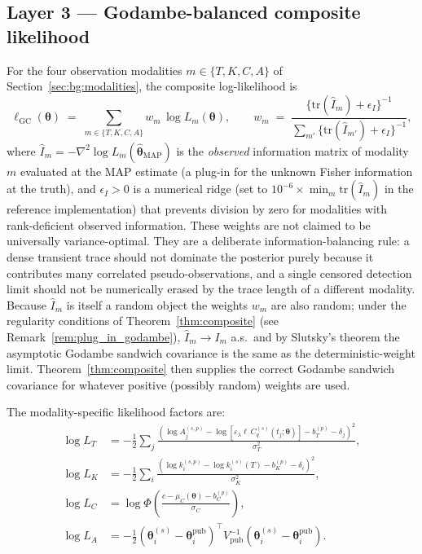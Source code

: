 \documentclass[12pt]{article}
\theoremstyle{plain}
\theoremstyle{definition}
\theoremstyle{remark}
\begin{document}
\subsection{Layer 3 --- Godambe-balanced composite likelihood}\label{sec:framework:composite}

For the four observation modalities $m\in\{T,K,C,A\}$ of
Section~\ref{sec:bg:modalities}, the composite log-likelihood is
%
\begin{equation}
  \ell_{\mathrm{GC}}(\boldsymbol\theta)
  \;=\; \sum_{m\in\{T,K,C,A\}} w_m\,\log L_m(\boldsymbol\theta),
  \qquad
  w_m \;=\;
  \frac{\{\mathrm{tr}(\hat I_m)+\epsilon_I\}^{-1}}
       {\sum_{m'}\{\mathrm{tr}(\hat I_{m'})+\epsilon_I\}^{-1}},
  \label{eq:composite}
\end{equation}
%
where $\hat I_m = -\nabla^2\log L_m(\hat{\boldsymbol\theta}_{\mathrm{MAP}})$
is the \emph{observed} information matrix of modality $m$ evaluated at the
MAP estimate (a plug-in for the unknown Fisher information at the truth),
and $\epsilon_I>0$ is a numerical ridge (set to
$10^{-6}\times\min_m\mathrm{tr}(\hat I_m)$ in the reference implementation)
that prevents division by zero for modalities with rank-deficient observed
information.  These weights are not claimed to be universally
variance-optimal.  They are a deliberate information-balancing rule: a
dense transient trace should not dominate the posterior purely because it
contributes many correlated pseudo-observations, and a single censored
detection limit should not be numerically erased by the trace length of a
different modality.  Because $\hat I_m$ is itself a random object the weights
$w_m$ are also random; under the regularity conditions of
Theorem~\ref{thm:composite} (see Remark~\ref{rem:plug_in_godambe}),
$\hat I_m\to I_m$ a.s.\ and by Slutsky's theorem the asymptotic Godambe
sandwich covariance is the same as the deterministic-weight limit.
Theorem~\ref{thm:composite} then supplies the correct Godambe sandwich
covariance for whatever positive (possibly random) weights are used.

The modality-specific likelihood factors are:
%
\begin{align}
  \log L_T &= -\tfrac{1}{2}\sum_{j} \frac{(\log A^{(s,p)}_j - \log[\varepsilon_\lambda \ell\, C^{(s)}_q(t_j;\boldsymbol\theta)] - b^{(p)}_T - \delta_j)^2}{\sigma_T^2}, \label{eq:lik_T} \\
  \log L_K &= -\tfrac{1}{2}\sum_{i} \frac{(\log k^{(s,p)}_i - \log k_i^{(s)}(T) - b^{(p)}_K - \delta_i)^2}{\sigma_K^2}, \label{eq:lik_K} \\
  \log L_C &= \log\Phi\!\left(\frac{c - \mu_C(\boldsymbol\theta) - b^{(p)}_C}{\sigma_C}\right), \label{eq:lik_C} \\
  \log L_A &= -\tfrac{1}{2}(\boldsymbol\theta_i^{(s)} - \boldsymbol\theta_i^{\mathrm{pub}})^\top V_{\mathrm{pub}}^{-1}(\boldsymbol\theta_i^{(s)} - \boldsymbol\theta_i^{\mathrm{pub}}). \label{eq:lik_A}
\end{align}
\end{document}
